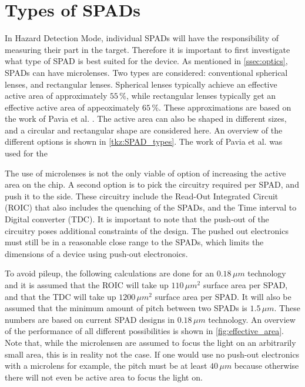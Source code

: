 \section{Types of SPADs}\label{ssec:SPADs}
In Hazard Detection Mode, individual SPADs will have the responsibility of measuring their part in the target. Therefore it is important to first investigate what type of SPAD is best suited for the device. As mentioned in \cref{ssec:optics}, SPADs can have microlenses. Two types are considered: conventional spherical lenses, and rectangular lenses. Spherical lenses typically achieve an effective active area of approximately $55\,\%$, while rectangular lenses typically get an effective active area of appeoximately $65\,\%$. These approximations are based on the work of Pavia et al. \cite{pavia2014measurement}. The active area can also be shaped in different sizes, and a circular and rectangular shape are considered here. An overview of the different options is shown in \cref{tkz:SPAD_types}. The work of Pavia et al. was used for the 





The use of microlenses is not the only viable of option of increasing the active area on the chip. A second option is to pick the circuitry required per SPAD, and push it to the side. These circuitry include the Read-Out Integrated Circuit (ROIC) that also includes the quenching of the SPADs, and the Time interval to Digital converter (TDC). It is important to note that the push-out of the circuitry poses additional constraints of the design. The pushed out electronics must still be in a reasonable close range to the SPADs, which limits the dimensions of a device using push-out electronoics.

To avoid pileup, the following calculations are done for an $0.18\,\mu m$ technology and it is assumed that the ROIC will take up $110\,\mu m^2$ surface area per SPAD, and that the TDC will take up $1200\,\mu m^2$ surface area per SPAD. It will also be assumed that the minimum amount of pitch between two SPADs is $1.5\,\mu m$. These numbers are based on current SPAD designs in $0.18\,\mu m$ technology. An overview of the performance of all different possibilities is shown in \cref{fig:effective_area}. Note that, while the microlensen are assumed to focus the light on an arbitrarily small area, this is in reality not the case. If one would use no push-out electronics with a microlens for example, the pitch must be at least $40\,\mu m$ because otherwise there will not even be active area to focus the light on.

